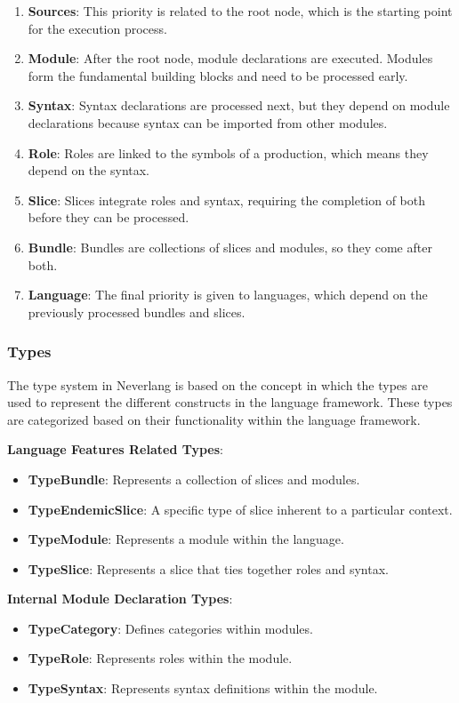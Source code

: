 \begin{enumerate}
    \item \textbf{Sources}: This priority is related to the root node, which is the starting point for the execution process.
    \item \textbf{Module}: After the root node, module declarations are executed. Modules form the fundamental building blocks and need to be processed early.
    \item \textbf{Syntax}: Syntax declarations are processed next, but they depend on module declarations because syntax can be imported from other modules.
    \item \textbf{Role}: Roles are linked to the symbols of a production, which means they depend on the syntax.
    \item \textbf{Slice}: Slices integrate roles and syntax, requiring the completion of both before they can be processed.
    \item \textbf{Bundle}: Bundles are collections of slices and modules, so they come after both.
    \item \textbf{Language}: The final priority is given to languages, which depend on the previously processed bundles and slices.
\end{enumerate}

\subsubsection{Types}\label{sec:neverlang-types}

The type system in Neverlang is based on the concept in which the types are used to represent the different constructs in the language framework. These types are categorized based on their functionality within the language framework.

\hfill \break
\noindent
\textbf{Language Features Related Types}:
\begin{itemize}
    \item \textbf{TypeBundle}: Represents a collection of slices and modules.
\item \textbf{TypeEndemicSlice}: A specific type of slice inherent to a particular context.
\item \textbf{TypeModule}: Represents a module within the language.
\item \textbf{TypeSlice}: Represents a slice that ties together roles and syntax.
\end{itemize}

\hfill \break
\noindent
\textbf{Internal Module Declaration Types}:
\begin{itemize}
\item \textbf{TypeCategory}: Defines categories within modules.
\item \textbf{TypeRole}: Represents roles within the module.
\item \textbf{TypeSyntax}: Represents syntax definitions within the module.
\end{itemize}

